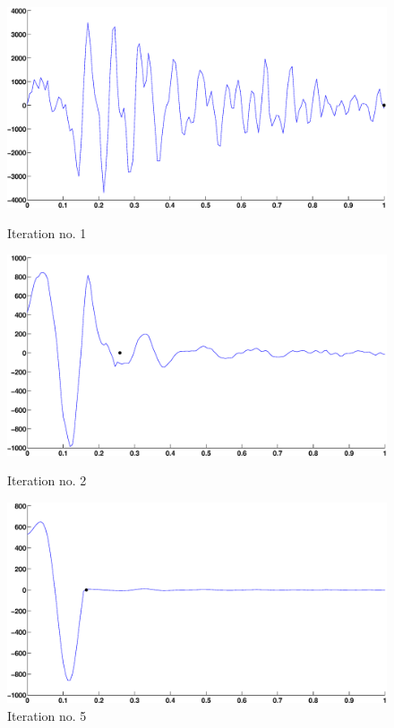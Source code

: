 \documentclass[12pt,a4]{article}
\begin{document}
\begin{figure}[H]
\begin{center}
 \includegraphics[scale=.35]{img/Approx_iter_onePer-v2-1.eps}
 \caption{Iteration no. 1}
 \includegraphics[scale=.35]{img/Approx_iter_onePer-v2-2.eps}
 \caption{Iteration no. 2}
 \includegraphics[scale=.35]{img/Approx_iter_onePer-v2-4.eps}
 \caption{Iteration no. 5}\label{fig:app1-end}
\end{center}
\end{figure}
\end{document}
